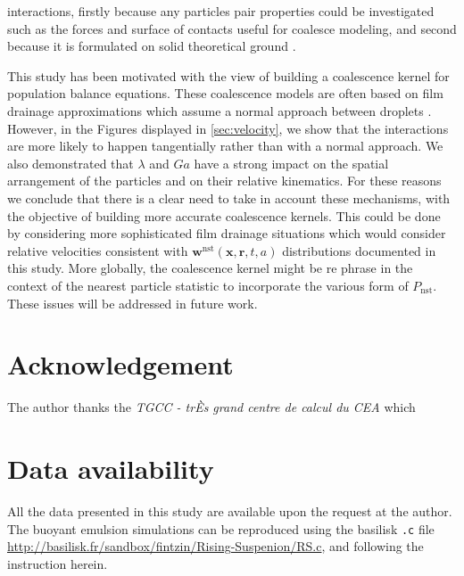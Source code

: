 interactions, firstly because any particles pair properties could be investigated such as the forces and surface of contacts useful for coalesce modeling, and second because it is formulated on solid theoretical ground \citep{zhang2021ensemble}. 



This study has been motivated with the view of building a coalescence kernel for population balance equations. 
These coalescence models are often based on film drainage approximations which assume a normal approach between droplets \citet{chesters1991modelling}.  
However, in the Figures displayed in \ref{sec:velocity}, we show that the interactions are more likely to happen tangentially rather than with a normal approach. 
We also demonstrated that $\lambda$ and $Ga$ have a strong impact on the spatial arrangement of the particles and on their relative kinematics. 
For these reasons we conclude that there is a clear need to take in account these mechanisms, with the objective of building more accurate coalescence kernels. 
This could be done by considering more sophisticated film drainage situations which would consider relative velocities consistent with $\textbf{w}^\text{nst}(\textbf{x},\textbf{r},t,a)$ distributions documented in this study.
More globally, the coalescence kernel might be re phrase in the context of the nearest particle statistic to incorporate the various form of $P_\text{nst}$. 
These issues will be addressed in future work.  


\section*{Acknowledgement}

The author thanks the \textit{TGCC - trÈs grand centre de calcul du CEA} which 

\section*{Data availability}

All the data presented in this study are available upon the request at the author. 
The buoyant emulsion simulations can be reproduced using the basilisk \texttt{.c} file \url{http://basilisk.fr/sandbox/fintzin/Rising-Suspenion/RS.c}, and following the instruction herein. 
